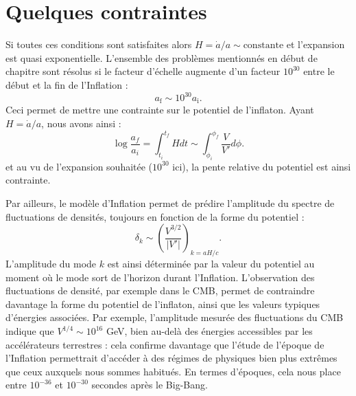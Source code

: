 \section{Quelques contraintes}
Si toutes ces conditions sont satisfaites alors $H=\dot a /a \sim \mathrm{constante}$ et l'expansion est quasi exponentielle. L'ensemble des problèmes mentionnés en début de chapitre sont résolus si le facteur d'échelle augmente d'un facteur $10^{30}$ entre le début et la fin de l'Inflation :
\begin{equation}
a_\mathrm{f}\sim 10^{30} a_\mathrm{i}.
\end{equation}
Ceci permet de mettre une contrainte sur le potentiel de l'inflaton. Ayant $H=\dot a/a$, nous avons ainsi :
\begin{equation}
\log \frac{a_f}{a_i}=\int_{t_i}^{t_f} H dt \sim \int_{\phi_i}^{\phi_f}\frac{V}{V'}d \phi.
\end{equation}
et au vu de l'expansion souhaitée ($10^{30}$ ici), la pente relative du potentiel est ainsi contrainte.

Par ailleurs, le modèle d'Inflation permet de prédire l'amplitude du spectre de fluctuations de densités, toujours en fonction de la forme du potentiel :
\begin{equation}
\delta_k\sim \left(\frac{V^{3/2}}{|V'|}\right)_{k=aH/c}.
\end{equation}
L'amplitude du mode $k$ est ainsi déterminée par la valeur du potentiel au moment où le mode sort de l'horizon durant l'Inflation. L'observation des fluctuations de densité, par exemple dans le CMB, permet de contraindre davantage la forme du potentiel de l'inflaton, ainsi que les valeurs typiques d'énergies associées. Par exemple, l'amplitude mesurée des fluctuations du CMB indique que $V^{1/4}\sim 10^{16}$ GeV, bien au-delà des énergies accessibles par les accélérateurs terrestres : cela confirme davantage que l'étude de l'époque de l'Inflation permettrait d'accéder à des régimes de physiques bien plus extrêmes que ceux auxquels nous sommes habitués.  En termes d'époques, cela nous place entre $10^{-36}$ et $10^{-30}$ secondes après le Big-Bang. 

